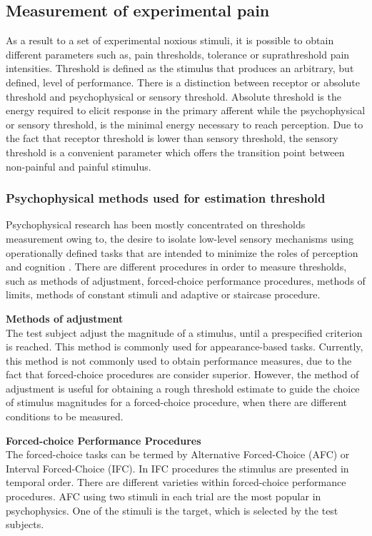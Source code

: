\subsection{Measurement of experimental pain}
As a result to a set of experimental noxious stimuli, it is possible to obtain different parameters such as, pain thresholds, tolerance or suprathreshold pain intensities. Threshold is defined as the stimulus that produces an arbitrary, but defined, level of performance. There is a distinction between receptor or absolute threshold and psychophysical or sensory threshold. Absolute threshold is the energy required to elicit response in the primary afferent while the psychophysical or sensory threshold, is the minimal energy necessary to reach perception. Due to the fact that receptor threshold is lower than sensory threshold, the sensory threshold is a convenient parameter which offers the transition point between non-painful and painful stimulus. \cite{Yarnitsky2006}

\subsubsection{Psychophysical methods used for estimation threshold}
Psychophysical research has been mostly concentrated on thresholds measurement owing to, the desire to isolate low-level sensory mechanisms using operationally defined tasks that are intended to minimize the roles of perception and cognition \cite{Pelli2010}. There are different procedures in order to measure thresholds, such as methods of adjustment, forced-choice performance procedures, methods of limits, methods of constant stimuli and adaptive or staircase procedure.


\textbf{Methods of adjustment}
\\
The test subject adjust the magnitude of a stimulus, until a prespecified criterion is reached. This method is commonly used for appearance-based tasks. Currently, this method is not commonly used to obtain performance measures, due to the fact that forced-choice procedures are consider superior. However, the method of adjustment is useful for obtaining a rough threshold estimate to guide the choice of stimulus magnitudes for a forced-choice procedure, when there are different conditions to be measured.

\textbf{Forced-choice Performance Procedures}
\\
The forced-choice tasks can be termed by Alternative Forced-Choice (AFC) or Interval Forced-Choice (IFC). In IFC procedures the stimulus are presented in temporal order. There are different varieties within forced-choice performance procedures. AFC using two stimuli in each trial are the most popular in psychophysics. One of the stimuli is the target, which is selected by the test subjects.


